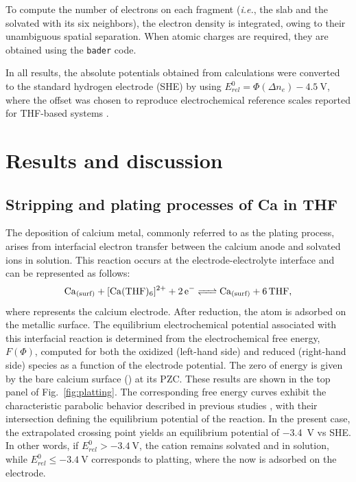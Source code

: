 \documentclass[twoside,twocolumn,9pt]{article}
\begin{document}
To compute the number of electrons on each fragment (\textit{i.e.}, the slab and the solvated  with its six neighbors), the electron density is integrated, owing to their unambiguous spatial separation.  
When atomic charges are required, they are obtained using the \texttt{bader} code\cite{tangGridbasedBaderAnalysis2009,yuAccurateEfficientAlgorithm2011}.

In all results, the absolute potentials obtained from calculations were converted to the standard hydrogen electrode (SHE) by using $E^0_{rel} = \Phi(\Delta n_e) - \SI{4.5}{\volt}$, where the offset was chosen to reproduce electrochemical reference scales reported for THF-based systems \cite{marenichComputationalElectrochemistryPrediction2014,dudaRedoxPotentialsHydrogen2026b}.


\section{Results and discussion} \label{sec:results}

\subsection{Stripping and plating processes of Ca in THF}

The deposition of calcium metal, commonly referred to as the plating process, arises from interfacial electron transfer between the calcium anode and solvated  ions in solution. 
This reaction occurs at the electrode-electrolyte interface and can be represented as follows:
\begin{equation*}
	\ce{Ca_{(surf)} + [Ca(THF)_6]^2+ + 2e^- <=> Ca_{(surf)} + 6 THF},
\end{equation*}
where  represents the calcium electrode. 
After reduction, the  atom is adsorbed on the metallic surface.
The equilibrium electrochemical potential associated with this interfacial reaction is determined from the electrochemical free energy, $F(\Phi)$, computed for both the oxidized (left-hand side) and reduced (right-hand side) species as a function of the electrode potential. 
The zero of energy is given by the bare calcium surface () at its PZC. 
These results are shown in the top panel of Fig.~\ref{fig:platting}. 
The corresponding free energy curves exhibit the characteristic parabolic behavior described in previous studies \cite{hagopianInitioModellingInterfacial2021,hagopianAdvancementHomogeneousBackground2022}, with their intersection defining the equilibrium potential of the reaction. 
In the present case, the extrapolated crossing point yields an equilibrium potential of \SI{-3.4}{\volt} vs SHE. 
In other words, if $E^0_{rel} > \SI{-3.4}{\volt}$, the  cation remains  solvated and in solution, while $E^0_{rel} \leq \SI{-3.4}{\volt}$ corresponds to platting, where the now  is adsorbed on the electrode.
\end{document}
